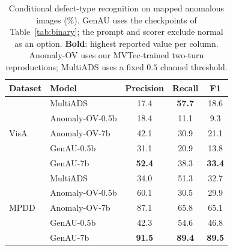 \begin{table}
\small
\centering
\caption[Conditional defect-type recognition.]{Conditional defect-type recognition on mapped anomalous images (\%). GenAU uses the checkpoints of Table~\ref{tab:binary}; the prompt and scorer exclude normal as an option. \textbf{Bold}: highest reported value per column. Anomaly-OV uses our MVTec-trained two-turn reproductions; MultiADS uses a fixed $0.5$ channel threshold.}
\label{tab:multytype_zero_shot_detection_performance}
\begin{tabular}{@{}llccc@{}}
\toprule
\textbf{Dataset}          & \textbf{Model} & \textbf{Precision} & \textbf{Recall} & \textbf{F1} \\ \midrule
\multirow{5}{*}{VisA}     & MultiADS         & 17.4          & \textbf{57.7} & 18.6          \\
                          & Anomaly-OV-0.5b  & 18.4          & 11.1          & 9.3           \\
                          & Anomaly-OV-7b  & 42.1          & 30.9          & 21.1           \\
                          \cline{2-5}
                          & GenAU-0.5b         & 31.1 & 20.9          & 13.8 \\
                          & GenAU-7b         & \textbf{52.4} & 38.3          & \textbf{33.4} \\ \midrule
\multirow{5}{*}{MPDD}     & MultiADS         & 34.0          & 51.3          & 32.7          \\
                          & Anomaly-OV-0.5b  & 60.1          & 30.5           & 29.9          \\
                          & Anomaly-OV-7b  & 87.1          & 65.8           & 65.1          \\
                          \cline{2-5}
                          & GenAU-0.5b         & 42.3 & 54.6          & 46.8 \\
                          & GenAU-7b         & \textbf{91.5} & \textbf{89.4} & \textbf{89.5} \\
\bottomrule
\end{tabular}
\end{table}



